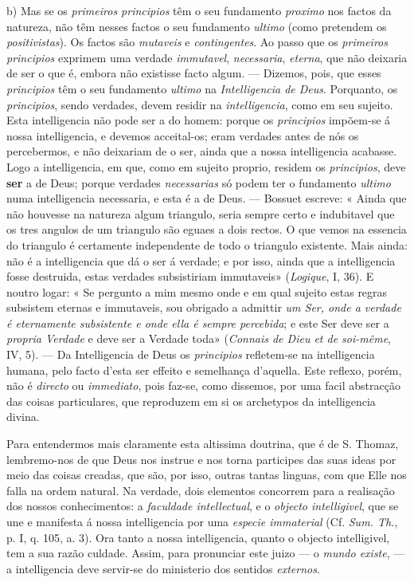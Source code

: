 b) Mas se os \emph{primeiros principios} têm o seu fundamento \emph{proximo} nos factos da natureza, não têm nesses factos o seu fundamento \emph{ultimo} (como pretendem os \emph{positivistas}). Os factos são \emph{mutaveis} e \emph{contingentes}. Ao passo que os \emph{primeiros principios} exprimem uma verdade \emph{immutavel}, \emph{necessaria}, \emph{eterna}, que não deixaria de ser o que é, embora não existisse facto algum. --- Dizemos, pois, que esses \emph{principios} têm o seu fundamento \emph{ultimo} na \emph{Intelligencia de Deus}. Porquanto, os \emph{principios}, sendo verdades, devem residir na \emph{intelligencia}, como em seu sujeito. Esta intelligencia não pode ser a do homem: porque os \emph{principios} impõem-se á nossa intelligencia, e devemos acceital-os; eram verdades antes de nós os percebermos, e não deixariam de o ser, ainda que a nossa intelligencia acabasse. Logo a intelligencia, em que, como em sujeito proprio, residem os \emph{principios}, deve \textbf{ser} a de Deus; porque verdades \emph{necessarias} só podem ter o fundamento \emph{ultimo} numa intelligencia necessaria, e esta é a de Deus. --- Bossuet escreve: « Ainda que não houvesse na natureza algum triangulo, seria sempre certo e indubitavel que os tres angulos de um triangulo são eguaes a dois rectos. O que vemos na essencia do triangulo é certamente independente de todo o triangulo existente. Mais ainda: não é a intelligencia que dá o ser á verdade; e por isso, ainda que a intelligencia fosse destruida, estas verdades subsistiriam immutaveis» (\emph{Logique}, I, 36). E noutro logar: « Se pergunto a mim mesmo onde e em qual sujeito estas regras subsistem eternas e immutaveis, sou obrigado a admittir \emph{um Ser, onde a verdade é eternamente subsistente e onde ella é sempre percebida}; e este Ser deve ser a \emph{propria Verdade} e deve ser a Verdade toda» (\emph{Connais de Dieu et de soi-même}, IV, 5). --- Da Intelligencia de Deus os \emph{principios} refletem-se na intelligencia humana, pelo facto d'esta ser effeito e semelhança d'aquella. Este reflexo, porém, não é \emph{directo} ou \emph{immediato}, pois faz-se, como dissemos, por uma facil abstracção das coisas particulares, que reproduzem em si os archetypos da intelligencia divina.

Para entendermos mais claramente esta altissima doutrina, que é de S. Thomaz, lembremo-nos de que Deus nos instrue e nos torna participes das suas ideas por meio das coisas creadas, que são, por isso, outras tantas linguas, com que Elle nos falla na ordem natural. Na verdade, dois elementos concorrem para a realisação dos nossos conhecimentos: a \emph{faculdade intellectual}, e o \emph{objecto intelligivel}, que se une e manifesta á nossa intelligencia por uma \emph{especie immaterial} (Cf. \emph{Sum. Th.}, p. I, q. 105, a. 3). Ora tanto a nossa intelligencia, quanto o objecto intelligivel, tem a sua razão  culdade. Assim, para pronunciar este juizo --- o \emph{mundo existe}, --- a intelligencia deve servir-se do ministerio dos sentidos \emph{externos}.


